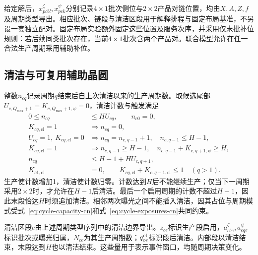 \documentclass[final,5p,times,twocolumn]{elsarticle}
\begin{document}
给定解后，$x^{\zeta}_{pcbl},x^{\psi}_{pck}$分别记录$4\times1$批次侧位与$2\times2$产品对链位置，均由$X,A,Z,f$及周期类型导出。相应批次、链段与清洁区段用于解释排程与固定布局基准，不另设一套独立配对。固定布局实验额外固定这些位置及服务次序，并采用仅末批补位规则：若后续同类批次存在，当前$4\times1$批次含两个产品对。联合模型允许在任一合法生产周期采用辅助补位。


\subsection{清洁与可复用辅助晶圆}

整数$n_{cq}$记录周期$q$结束后自上次清洁以来的生产周期数。取候选尾部$U_{c,Q_{\max}+1}=K_{c,Q_{\max}+1,\psi}=0$，清洁计数与触发满足
\begin{equation}
\begin{aligned}
0\le n_{cq}&\le H U_{cq},\qquad n_{c0}=0,\\
K_{cq,\mathrm{cl}}=1&\Rightarrow n_{cq}=0,\\
U_{cq}=1,\ K_{cq,\mathrm{cl}}=0
&\Rightarrow n_{cq}=n_{c,q-1}+1,\quad n_{c,q-1}\le H-1,\\
K_{cq,\mathrm{cl}}=1&\Rightarrow n_{c,q-1}\ge H-1,\quad
n_{c,q-1}+K_{c,q+1,\psi}\ge H,\\
n_{cq}&\le H-1+H U_{c,q+1},\\
K_{c1,\mathrm{cl}}&=0,\qquad
K_{cq,\mathrm{cl}}+K_{c,q-1,\mathrm{cl}}\le1\quad(q>1).
\end{aligned}
\label{eq:clean-counter-cn}
\end{equation}
生产使计数增加1，清洁使计数归零。计数达到$H$后不能继续生产；仅当下一周期采用$2\times2$时，才允许在$H-1$后清洁。最后一个启用周期的计数不超过$H-1$，因此末段恰达$H$时须追加清洁。相邻两次曝光之间不能插入清洁，因其占位与周期模式受式~\eqref{eq:cycle-capacity-cn}和式~\eqref{eq:cycle-exposures-cn}共同约束。

清洁区段$e$由上述周期类型序列中的清洁边界导出。$z_{ce}$标识生产段启用，$a^{\zeta}_{cbe},a^{\psi}_{cqe}$标识批次或曝光归属，$N_{ce}$为其生产周期数；$q^{\rm cl}_{ce}$标识段后清洁。内部段以清洁结束，末段达到$H$也以清洁结束。这些量用于表示事件窗口，均随周期决策变化。
\end{document}
